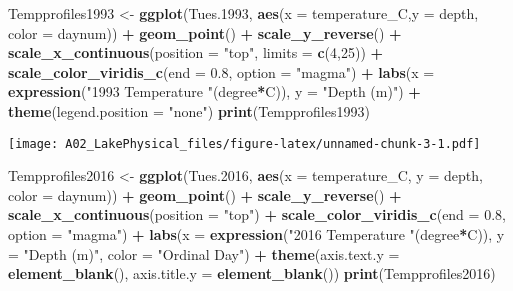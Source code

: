 \documentclass[]{article}
\newenvironment{Shaded}{\begin{snugshade}}{\end{snugshade}}
\newcommand{\DataTypeTok}[1]{\textcolor[rgb]{0.13,0.29,0.53}{#1}}
\newcommand{\DecValTok}[1]{\textcolor[rgb]{0.00,0.00,0.81}{#1}}
\newcommand{\FloatTok}[1]{\textcolor[rgb]{0.00,0.00,0.81}{#1}}
\newcommand{\KeywordTok}[1]{\textcolor[rgb]{0.13,0.29,0.53}{\textbf{#1}}}
\newcommand{\NormalTok}[1]{#1}
\newcommand{\OperatorTok}[1]{\textcolor[rgb]{0.81,0.36,0.00}{\textbf{#1}}}
\newcommand{\StringTok}[1]{\textcolor[rgb]{0.31,0.60,0.02}{#1}}
\begin{document}
\begin{Shaded}
\begin{Highlighting}[]
\NormalTok{Tempprofiles1993 <-}\StringTok{ }
\StringTok{  }\KeywordTok{ggplot}\NormalTok{(Tues}\FloatTok{.1993}\NormalTok{, }\KeywordTok{aes}\NormalTok{(}\DataTypeTok{x =}\NormalTok{ temperature_C,}\DataTypeTok{y =}\NormalTok{ depth, }\DataTypeTok{color =}\NormalTok{ daynum)) }\OperatorTok{+}
\StringTok{  }\KeywordTok{geom_point}\NormalTok{() }\OperatorTok{+}
\StringTok{  }\KeywordTok{scale_y_reverse}\NormalTok{() }\OperatorTok{+}
\StringTok{  }\KeywordTok{scale_x_continuous}\NormalTok{(}\DataTypeTok{position =} \StringTok{"top"}\NormalTok{, }\DataTypeTok{limits =} \KeywordTok{c}\NormalTok{(}\DecValTok{4}\NormalTok{,}\DecValTok{25}\NormalTok{)) }\OperatorTok{+}
\StringTok{  }\KeywordTok{scale_color_viridis_c}\NormalTok{(}\DataTypeTok{end =} \FloatTok{0.8}\NormalTok{, }\DataTypeTok{option =} \StringTok{"magma"}\NormalTok{) }\OperatorTok{+}
\StringTok{  }\KeywordTok{labs}\NormalTok{(}\DataTypeTok{x =} \KeywordTok{expression}\NormalTok{(}\StringTok{"1993 Temperature "}\NormalTok{(degree}\OperatorTok{*}\NormalTok{C)), }\DataTypeTok{y =} \StringTok{"Depth (m)"}\NormalTok{) }\OperatorTok{+}
\StringTok{  }\KeywordTok{theme}\NormalTok{(}\DataTypeTok{legend.position =} \StringTok{"none"}\NormalTok{)}
\KeywordTok{print}\NormalTok{(Tempprofiles1993)}
\end{Highlighting}
\end{Shaded}

\texttt{[image: A02\_LakePhysical\_files/figure-latex/unnamed-chunk-3-1.pdf]}

\begin{Shaded}
\begin{Highlighting}[]
\NormalTok{Tempprofiles2016 <-}\StringTok{ }
\StringTok{  }\KeywordTok{ggplot}\NormalTok{(Tues}\FloatTok{.2016}\NormalTok{, }\KeywordTok{aes}\NormalTok{(}\DataTypeTok{x =}\NormalTok{ temperature_C, }\DataTypeTok{y =}\NormalTok{ depth, }\DataTypeTok{color =}\NormalTok{ daynum)) }\OperatorTok{+}
\StringTok{  }\KeywordTok{geom_point}\NormalTok{() }\OperatorTok{+}
\StringTok{  }\KeywordTok{scale_y_reverse}\NormalTok{() }\OperatorTok{+}
\StringTok{  }\KeywordTok{scale_x_continuous}\NormalTok{(}\DataTypeTok{position =} \StringTok{"top"}\NormalTok{) }\OperatorTok{+}
\StringTok{  }\KeywordTok{scale_color_viridis_c}\NormalTok{(}\DataTypeTok{end =} \FloatTok{0.8}\NormalTok{, }\DataTypeTok{option =} \StringTok{"magma"}\NormalTok{) }\OperatorTok{+}
\StringTok{  }\KeywordTok{labs}\NormalTok{(}\DataTypeTok{x =} \KeywordTok{expression}\NormalTok{(}\StringTok{"2016 Temperature "}\NormalTok{(degree}\OperatorTok{*}\NormalTok{C)), }\DataTypeTok{y =} \StringTok{"Depth (m)"}\NormalTok{,}
       \DataTypeTok{color =} \StringTok{"Ordinal Day"}\NormalTok{) }\OperatorTok{+}
\StringTok{  }\KeywordTok{theme}\NormalTok{(}\DataTypeTok{axis.text.y =} \KeywordTok{element_blank}\NormalTok{(), }\DataTypeTok{axis.title.y =} \KeywordTok{element_blank}\NormalTok{())}
\KeywordTok{print}\NormalTok{(Tempprofiles2016)}
\end{Highlighting}
\end{Shaded}
\end{document}
